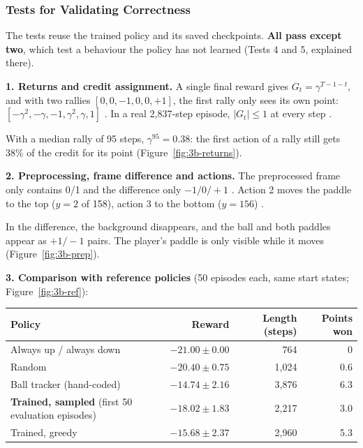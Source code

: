 \subsubsection{Tests for Validating Correctness}

The tests reuse the trained policy and its saved checkpoints. \textbf{All pass except two}, which test a behaviour the policy has not learned (Tests 4 and 5, explained there).

\textbf{1. Returns and credit assignment.} A single final reward gives $G_t = \gamma^{T-1-t}$, and with two rallies $[0, 0, -1, 0, 0, +1]$, the first rally only sees its own point: $[-\gamma^2, -\gamma, -1, \gamma^2, \gamma, 1]$ \pass. In a real 2,837-step episode, $|G_t| \le 1$ at every step \pass.


With a median rally of 95 steps, $\gamma^{95} = 0.38$: the first action of a rally still gets 38\% of the credit for its point (Figure~\ref{fig:3b-returns}).

\textbf{2. Preprocessing, frame difference and actions.} The preprocessed frame only contains 0/1 and the difference only $-1/0/+1$ \pass. Action 2 moves the paddle to the top ($y = 2$ of 158), action 3 to the bottom ($y = 156$) \pass.


In the difference, the background disappears, and the ball and both paddles appear as $+1/-1$ pairs. The player's paddle is only visible while it moves (Figure~\ref{fig:3b-prep}).

\textbf{3. Comparison with reference policies} (50 episodes each, same start states; Figure~\ref{fig:3b-ref}):

\begin{center}
\small
\begin{tabular}{@{}lrrr@{}}
  \toprule
  \textbf{Policy} & \textbf{Reward} & \textbf{Length (steps)} & \textbf{Points won} \\
  \midrule
  Always up / always down & $-21.00 \pm 0.00$ & 764 & 0 \\
  Random & $-20.40 \pm 0.75$ & 1,024 & 0.6 \\
  Ball tracker (hand-coded) & $-14.74 \pm 2.16$ & 3,876 & 6.3 \\
  \textbf{Trained, sampled} (first 50 evaluation episodes) & $\mathbf{-18.02 \pm 1.83}$ & 2,217 & 3.0 \\
  Trained, greedy & $-15.68 \pm 2.37$ & 2,960 & 5.3 \\
  \bottomrule
\end{tabular}
\end{center}

